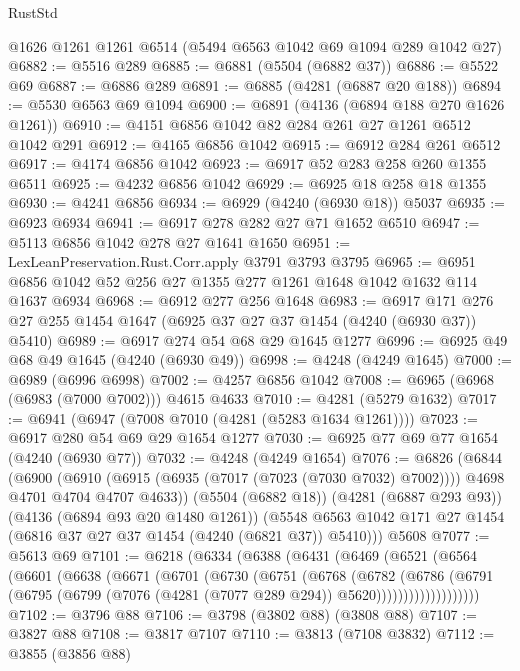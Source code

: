 \begin{lexlean}{RustStd}
\begin{coremodule}
    @1626
    @1261
    @1261
    @6514
    (@5494 @6563 @1042 @69 @1094 @289 @1042 @27)
@6882 := @5516 @289
@6885 := @6881 (@5504 (@6882 @37))
@6886 := @5522 @69
@6887 := @6886 @289
@6891 := @6885 (@4281 (@6887 @20 @188))
@6894 := @5530 @6563 @69 @1094
@6900 := @6891 (@4136 (@6894 @188 @270 @1626 @1261))
@6910 := @4151 @6856 @1042 @82 @284 @261 @27 @1261 @6512 @1042 @291
@6912 := @4165 @6856 @1042
@6915 := @6912 @284 @261 @6512
@6917 := @4174 @6856 @1042
@6923 := @6917 @52 @283 @258 @260 @1355 @6511
@6925 := @4232 @6856 @1042
@6929 := @6925 @18 @258 @18 @1355
@6930 := @4241 @6856
@6934 := @6929 (@4240 (@6930 @18)) @5037
@6935 := @6923 @6934
@6941 := @6917 @278 @282 @27 @71 @1652 @6510
@6947 := @5113 @6856 @1042 @278 @27 @1641 @1650
@6951 := LexLeanPreservation.Rust.Corr.apply @3791 @3793 @3795
@6965 := @6951 @6856 @1042 @52 @256 @27 @1355 @277 @1261 @1648 @1042 @1632 @114 @1637 @6934
@6968 := @6912 @277 @256 @1648
@6983 := @6917 @171 @276 @27 @255 @1454 @1647 (@6925 @37 @27 @37 @1454 (@4240 (@6930 @37)) @5410)
@6989 := @6917 @274 @54 @68 @29 @1645 @1277
@6996 := @6925 @49 @68 @49 @1645 (@4240 (@6930 @49))
@6998 := @4248 (@4249 @1645)
@7000 := @6989 (@6996 @6998)
@7002 := @4257 @6856 @1042
@7008 := @6965 (@6968 (@6983 (@7000 @7002))) @4615 @4633
@7010 := @4281 (@5279 @1632)
@7017 := @6941 (@6947 (@7008 @7010 (@4281 (@5283 @1634 @1261))))
@7023 := @6917 @280 @54 @69 @29 @1654 @1277
@7030 := @6925 @77 @69 @77 @1654 (@4240 (@6930 @77))
@7032 := @4248 (@4249 @1654)
@7076 := @6826
    (@6844
      (@6900
        (@6910 (@6915 (@6935 (@7017 (@7023 (@7030 @7032) @7002)))) @4698 @4701 @4704 @4707 @4633))
      (@5504 (@6882 @18))
      (@4281 (@6887 @293 @93))
      (@4136 (@6894 @93 @20 @1480 @1261))
      (@5548 @6563 @1042 @171 @27 @1454 (@6816 @37 @27 @37 @1454 (@4240 (@6821 @37)) @5410)))
    @5608
@7077 := @5613 @69
@7101 := @6218
    (@6334
      (@6388
        (@6431
          (@6469
            (@6521
              (@6564
                (@6601
                  (@6638
                    (@6671
                      (@6701
                        (@6730
                          (@6751
                            (@6768
                              (@6782
                                (@6786
                                  (@6791
                                    (@6795
                                      (@6799
                                        (@7076 (@4281 (@7077 @289 @294)) @5620)))))))))))))))))))
@7102 := @3796 @88
@7106 := @3798 (@3802 @88) (@3808 @88)
@7107 := @3827 @88
@7108 := @3817 @7107
@7110 := @3813 (@7108 @3832)
@7112 := @3855 (@3856 @88)

\end{coremodule}
\end{lexlean}
